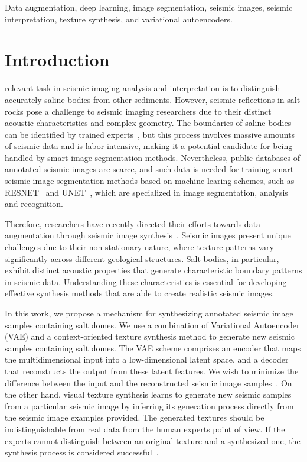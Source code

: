 ﻿\documentclass{ieeeaccess}
\begin{document}
\begin{keywords}
Data augmentation, deep learning, image segmentation, seismic images, seismic interpretation, texture synthesis, and variational autoencoders.
\end{keywords}

\titlepgskip=-21pt

\maketitle

\section{Introduction}
\label{sec:introduction}
 relevant task in seismic imaging analysis and interpretation is to distinguish accurately saline bodies from other sediments. However, seismic reflections in salt rocks pose a challenge to seismic imaging researchers due to their distinct acoustic characteristics and complex geometry. The boundaries of saline bodies can be identified by trained experts~\cite{Zeng2019}, but this process involves massive amounts of seismic data and is labor intensive, making it a potential candidate for being handled by smart image segmentation methods. Nevertheless, public databases of annotated seismic images are scarce, and such data is needed for training smart seismic image segmentation methods based on machine learing schemes, such as RESNET~\cite{He2016} and UNET~\cite{Ronneberger2015}, which are specialized in image segmentation, analysis and recognition. 

Therefore, researchers have recently directed their efforts towards data augmentation through seismic image synthesis~\cite{Henriques2021}. Seismic images present unique challenges due to their non-stationary nature, where texture patterns vary significantly across different geological structures. Salt bodies, in particular, exhibit distinct acoustic properties that generate characteristic boundary patterns in seismic data. Understanding these characteristics is essential for developing effective synthesis methods that are able to create realistic seismic images.

In this work, we propose a mechanism for synthesizing annotated seismic image samples containing salt domes. We use a combination of Variational Autoencoder (VAE) and a context-oriented texture synthesis method to generate new seismic samples containing salt domes. The VAE scheme comprises an encoder that maps the multidimensional input into a low-dimensional latent space, and a decoder that reconstructs the output from these latent features. We wish to minimize the difference between the input and the reconstructed seismic image samples~\cite{Li2020}. On the other hand, visual texture synthesis learns to generate new seismic samples from a particular seismic image by inferring its generation process directly from the seismic image examples provided. The generated textures should be indistinguishable from real data from the human experts point of view. If the experts cannot distinguish between an original texture and a synthesized one, the synthesis process is considered successful~\cite{Gatys2015}.
\end{document}
